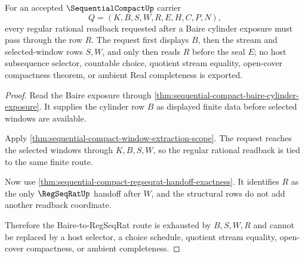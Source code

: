 \begin{theorem}
\label{thm:sequential-compact-baire-regseqrat-exhaustion}
For an accepted $\SequentialCompactUp$ carrier
$$
Q=(K,B,S,W,R,E,H,C,P,N),
$$
every regular rational readback requested after a Baire cylinder exposure must pass through the row $R$. The request first displays $B$, then the stream and selected-window rows $S,W$, and only then reads $R$ before the seal $E$; no host subsequence selector, countable choice, quotient stream equality, open-cover compactness theorem, or ambient Real completeness is exported.
\end{theorem}
\begin{proof}
Read the Baire exposure through \autoref{thm:sequential-compact-baire-cylinder-exposure}. It supplies the cylinder row $B$ as displayed finite data before selected windows are available.

Apply \autoref{thm:sequential-compact-window-extraction-scope}. The request reaches the selected windows through $K,B,S,W$, so the regular rational readback is tied to the same finite route.

Now use \autoref{thm:sequential-compact-regseqrat-handoff-exactness}. It identifies $R$ as the only $\RegSeqRatUp$ handoff after $W$, and the structural rows do not add another readback coordinate.

Therefore the Baire-to-RegSeqRat route is exhausted by $B,S,W,R$ and cannot be replaced by a host selector, a choice schedule, quotient stream equality, open-cover compactness, or ambient completeness.
\end{proof}

